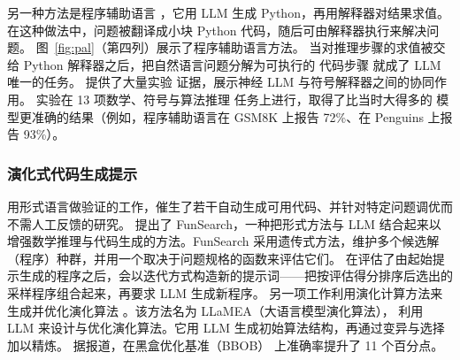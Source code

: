 另一种方法是程序辅助语言 \citep{gao2023pal}，它用 LLM 生成 Python，再用解释器对结果求值。在这种做法中，问题被翻译成小块 Python 代码，随后可由解释器执行来解决问题。
图~\ref{fig:pal}（第四列）展示了程序辅助语言方法。
%
%
当对推理步骤的求值被交给 Python
解释器之后，把自然语言问题分解为可执行的
代码步骤
就成了 LLM 唯一的任务。%
%
\citet{gao2023pal} 提供了大量实验
证据，展示神经 LLM 与符号解释器之间的协同作用。
实验在 13 项数学、符号与算法推理
任务上进行，取得了比当时大得多的
模型更准确的结果（例如，程序辅助语言在 GSM8K 上报告 72\%、在 Penguins 上报告 93\%）。%






\subsubsection{演化式代码生成提示}
用形式语言做验证的工作，催生了若干自动生成可用代码、并针对特定问题调优而不需人工反馈的研究。
\citet{romera2024mathematical} 提出了 FunSearch，一种把形式方法与 LLM 结合起来以增强数学推理与代码生成的方法。FunSearch %
采用遗传式方法，维护多个候选解（程序）种群，并用一个取决于问题规格的函数来评估它们。%
在评估了由起始提示生成的程序之后，会以迭代方式构造新的提示词——把按评估得分排序后选出的采样程序组合起来，再要求 LLM 生成新程序。
另一项工作利用演化计算方法来生成并优化演化算法 \citep{van2024llamea}。该方法名为 LLaMEA（大语言模型演化算法），
利用 LLM 来设计与优化演化算法。它用 LLM 生成初始算法结构，再通过变异与选择加以精炼。%
据报道，在黑盒优化基准（BBOB）\citep{hansen2010black} 上准确率提升了 11 个百分点。



